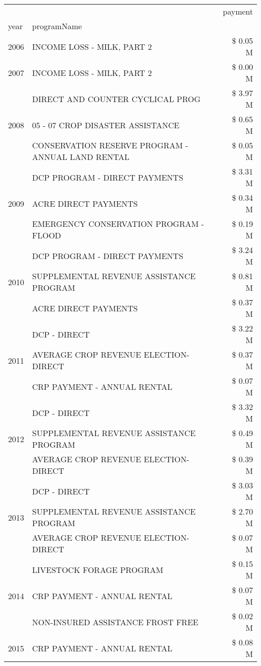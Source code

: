 \begin{tabular}{llr}
\toprule
 &  & payment \\
year & programName &  \\
\midrule
2006 & INCOME LOSS - MILK, PART 2 & \$ 0.05 M \\
\cline{1-3}
2007 & INCOME LOSS - MILK, PART 2 & \$ 0.00 M \\
\cline{1-3}
\multirow[t]{3}{*}{2008} & DIRECT AND COUNTER CYCLICAL PROG & \$ 3.97 M \\
 & 05 - 07 CROP DISASTER ASSISTANCE & \$ 0.65 M \\
 & CONSERVATION RESERVE PROGRAM - ANNUAL LAND RENTAL & \$ 0.05 M \\
\cline{1-3}
\multirow[t]{3}{*}{2009} & DCP PROGRAM - DIRECT PAYMENTS & \$ 3.31 M \\
 & ACRE DIRECT PAYMENTS & \$ 0.34 M \\
 & EMERGENCY CONSERVATION PROGRAM - FLOOD & \$ 0.19 M \\
\cline{1-3}
\multirow[t]{3}{*}{2010} & DCP PROGRAM - DIRECT PAYMENTS & \$ 3.24 M \\
 & SUPPLEMENTAL REVENUE ASSISTANCE PROGRAM & \$ 0.81 M \\
 & ACRE DIRECT PAYMENTS & \$ 0.37 M \\
\cline{1-3}
\multirow[t]{3}{*}{2011} & DCP - DIRECT & \$ 3.22 M \\
 & AVERAGE CROP REVENUE ELECTION-DIRECT & \$ 0.37 M \\
 & CRP PAYMENT - ANNUAL RENTAL & \$ 0.07 M \\
\cline{1-3}
\multirow[t]{3}{*}{2012} & DCP - DIRECT & \$ 3.32 M \\
 & SUPPLEMENTAL REVENUE ASSISTANCE PROGRAM & \$ 0.49 M \\
 & AVERAGE CROP REVENUE ELECTION-DIRECT & \$ 0.39 M \\
\cline{1-3}
\multirow[t]{3}{*}{2013} & DCP - DIRECT & \$ 3.03 M \\
 & SUPPLEMENTAL REVENUE ASSISTANCE PROGRAM & \$ 2.70 M \\
 & AVERAGE CROP REVENUE ELECTION-DIRECT & \$ 0.07 M \\
\cline{1-3}
\multirow[t]{3}{*}{2014} & LIVESTOCK FORAGE PROGRAM & \$ 0.15 M \\
 & CRP PAYMENT - ANNUAL RENTAL & \$ 0.07 M \\
 & NON-INSURED ASSISTANCE FROST FREE & \$ 0.02 M \\
\cline{1-3}
\multirow[t]{3}{*}{2015} & CRP PAYMENT - ANNUAL RENTAL & \$ 0.08 M \\

\end{tabular}
